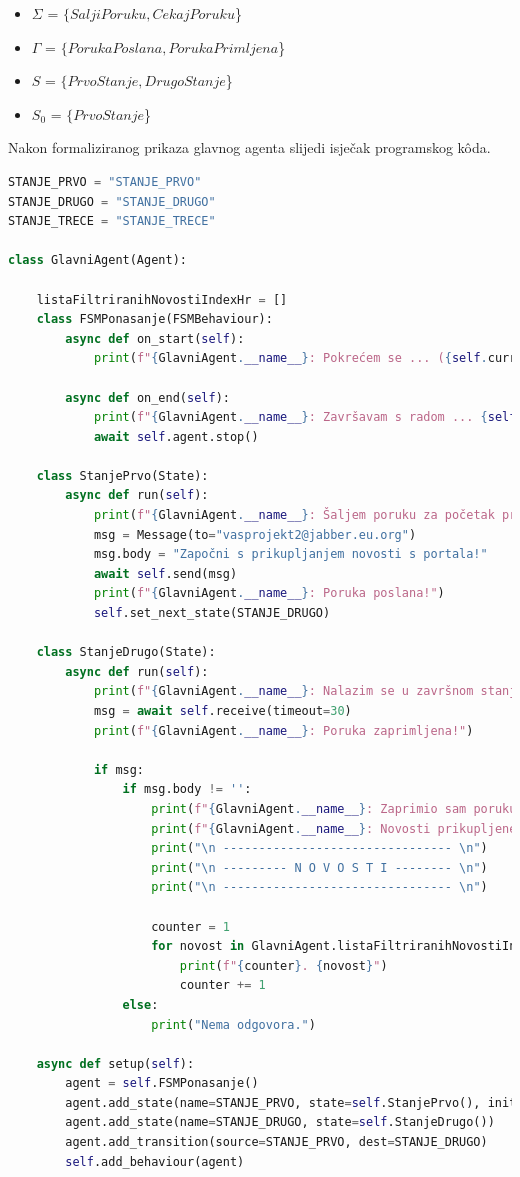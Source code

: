 \documentclass[]{foi} %
\begin{document}
\begin{itemize}
  \item \(\Sigma\) = $\{SaljiPoruku, CekajPoruku$\}
  \item \(\Gamma\) = $\{PorukaPoslana, PorukaPrimljena$\}
  \item \(S\) = $\{PrvoStanje, DrugoStanje$\}
  \item \(S_0\) = $\{PrvoStanje$\}
\end{itemize}

Nakon formaliziranog prikaza glavnog agenta slijedi isječak programskog kôda.
\begin{lstlisting}[language=Python,]
STANJE_PRVO = "STANJE_PRVO"
STANJE_DRUGO = "STANJE_DRUGO"
STANJE_TRECE = "STANJE_TRECE"

class GlavniAgent(Agent):

    listaFiltriranihNovostiIndexHr = []
    class FSMPonasanje(FSMBehaviour):
        async def on_start(self):
            print(f"{GlavniAgent.__name__}: Pokrećem se ... ({self.current_state})")

        async def on_end(self):
            print(f"{GlavniAgent.__name__}: Završavam s radom ... {self.current_state}")
            await self.agent.stop()

    class StanjePrvo(State):
        async def run(self):
            print(f"{GlavniAgent.__name__}: Šaljem poruku za početak prikupljanje novosti s portala ...")
            msg = Message(to="vasprojekt2@jabber.eu.org")
            msg.body = "Započni s prikupljanjem novosti s portala!"
            await self.send(msg)
            print(f"{GlavniAgent.__name__}: Poruka poslana!")
            self.set_next_state(STANJE_DRUGO)

    class StanjeDrugo(State):
        async def run(self):
            print(f"{GlavniAgent.__name__}: Nalazim se u završnom stanju. Čekam na primitak poruke ...")
            msg = await self.receive(timeout=30)
            print(f"{GlavniAgent.__name__}: Poruka zaprimljena!")
                    
            if msg:
                if msg.body != '':
                    print(f"{GlavniAgent.__name__}: Zaprimio sam poruku sljedećeg sadržaja: \"{msg.body}\"")
                    print(f"{GlavniAgent.__name__}: Novosti prikupljene i spremne za prikaz.")
                    print("\n -------------------------------- \n")
                    print("\n --------- N O V O S T I -------- \n")
                    print("\n -------------------------------- \n")

                    counter = 1
                    for novost in GlavniAgent.listaFiltriranihNovostiIndexHr:
                        print(f"{counter}. {novost}")
                        counter += 1
                else:
                    print("Nema odgovora.")

    async def setup(self):
        agent = self.FSMPonasanje()
        agent.add_state(name=STANJE_PRVO, state=self.StanjePrvo(), initial=True)
        agent.add_state(name=STANJE_DRUGO, state=self.StanjeDrugo())
        agent.add_transition(source=STANJE_PRVO, dest=STANJE_DRUGO)
        self.add_behaviour(agent)
\end{lstlisting}
\end{document}
